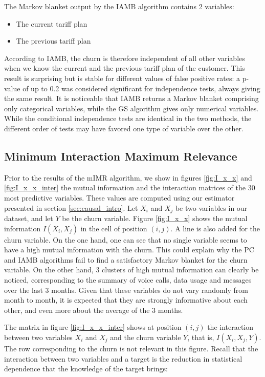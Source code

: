 The Markov blanket output by the IAMB algorithm contains 2 variables:
\noprelistbreak
\begin{itemize}
    \item The current tariff plan
    \item The previous tariff plan
\end{itemize}

According to IAMB, the churn is therefore independent of all other variables
when we know the current and the previous tariff plan of the customer. This
result is surprising but is stable for different values of false
positive rates: a p-value of up to 0.2 was considered significant for
independence tests, always giving the same result. It is noticeable that IAMB
returns a Markov blanket comprising only categorical variables, while the GS
algorithm gives only numerical variables. While the conditional independence
tests are identical in the two methods, the different order of tests may have
favored one type of variable over the other.

\subsection{Minimum Interaction Maximum Relevance}

Prior to the results of the mIMR algorithm, we show in figures \ref{fig:I_x_x}
and \ref{fig:I_x_x_inter} the mutual information and the interaction matrices of
the 30 most predictive variables. These values are computed using our estimator
presented in section \ref{sec:causal_intro}. Let $X_i$ and $X_j$ be two
variables in our dataset, and let $Y$ be the churn variable. Figure
\ref{fig:I_x_x} shows the mutual information $I(X_i, X_j)$ in the cell of
position $(i, j)$. A line is also added for the churn variable. On the one hand,
one can see that no single variable seems to have a high mutual information with
the churn. This could explain why the PC and IAMB algorithms fail to find a
satisfactory Markov blanket for the churn variable. On the other hand, 3
clusters of high mutual information can clearly be noticed, corresponding to the
summary of voice calls, data usage and messages over the last 3 months. Given
that these variables do not vary randomly from month to month, it is expected
that they are strongly informative about each other, and even more about the
average of the 3 months.

The matrix in figure \ref{fig:I_x_x_inter} shows at position $(i, j)$ the
interaction between two variables $X_i$ and $X_j$ and the churn variable $Y$,
that is, $I(X_i, X_j, Y)$. The row corresponding to the churn is not relevant in
this figure. Recall that the interaction between two variables and a target is
the reduction in statistical dependence that the knowledge of the target brings:

